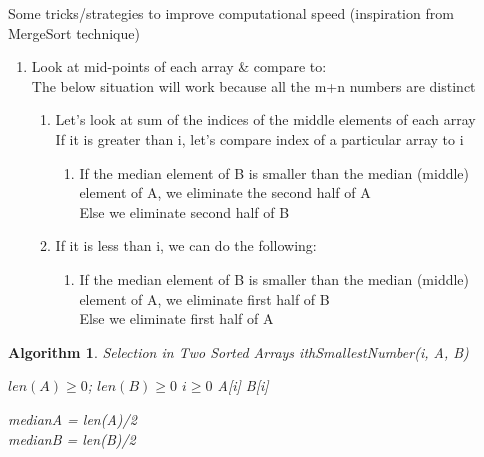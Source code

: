 \documentclass[11pt]{article}
\newtheorem{algorithm}{Algorithm}
\begin{document}
\begin{enumerate}
Some tricks/strategies to improve computational speed (inspiration from MergeSort technique)
\begin{enumerate}
    \item Look at mid-points of each array & compare to:\\
    The below situation will work because all the m+n numbers are distinct
    \begin{enumerate}
        \item Let's look at sum of the indices of the middle elements of each array\\
        If it is greater than i, let's compare index of a particular array to i
        \begin{enumerate}
            \item If the median element of B is smaller than the median (middle) element of A, we eliminate the second half of A\\
            Else we eliminate second half of B
        \end{enumerate}
        \item If it is less than i, we can do the following:
            \begin{enumerate}
                \item If the median element of B is smaller than the median (middle) element of A, we eliminate first half of B\\
                Else we eliminate first half of A
            \end{enumerate}
    \end{enumerate}
\end{enumerate}
\pagebreak
    \begin{algorithm}
        \caption{Selection in Two Sorted Arrays \rightarrow ithSmallestNumber(i, A, B)}
        \begin{algorithmic} 
            \REQUIRE $len(A) \geq 0$; $len(B) \geq 0$
            \ENSURE $i \geq 0$ \vspace{0.5cm}
            \RETURN A[i]
            \RETURN B[i]
            \ENDIF \vspace{0.5cm}
            
            medianA = len(A)/2\\
            medianB = len(B)/2  \vspace{0.5cm}
            
             {
                \ENDIF
            \vspace{0.3cm}
            }
            \ENDIF
            

\end{algorithmic}
\end{algorithm}
\end{enumerate}
\end{document}

